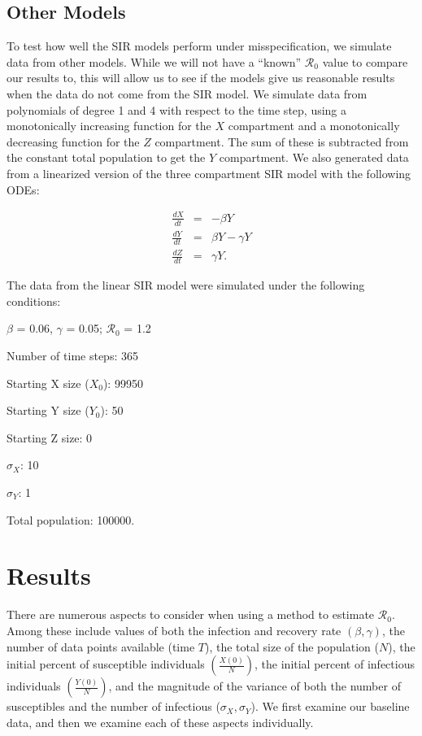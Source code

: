 \message{ !name(draft_v13.tex)}\documentclass[12pt]{article}
\newcommand{\rr}{\ensuremath{\mathcal{R}_0}}
\begin{document}
\subsection{Other Models}

To test how well the SIR models perform under misspecification, we simulate data from other models. While we will not have a ``known'' $\rr$ value to compare our results to, this will allow us to see if the models give us reasonable results when the data do not come from the SIR model. We simulate data from polynomials of degree 1 and 4 with respect to the time step, using a monotonically increasing function for the $X$ compartment and a monotonically decreasing function for the $Z$ compartment. The sum of these is subtracted from the constant total population to get the $Y$ compartment. We also generated data from a linearized version of the three compartment SIR model with the following ODEs:

\begin{eqnarray*}
	\frac{dX}{dt} &=& -\beta Y \\
	\frac{dY}{dt} &=& \beta Y - \gamma Y \\
	\frac{dZ}{dt} &=& \gamma Y.
\end{eqnarray*}

The data from the linear SIR model were simulated under the following conditions:

\begin{center}
	
	$\beta$ = 0.06, $\gamma$ = 0.05; $\rr$ = 1.2
	
	Number of time steps: 365
	
	Starting X size ($X_0$): 99950
	
	Starting Y size ($Y_0$): 50
	
	Starting Z size: 0 
	
	$\sigma_X$: 10
	
	$\sigma_Y$: 1
	
	Total population: 100000.
	
\end{center}

\section{Results}\label{sec:results}
There are numerous aspects to consider when using a method to estimate $\rr$.  Among these include values of both the infection and recovery rate $(\beta, \gamma)$, the number of data points available (time $T$), the total size of the population ($N$), the initial percent of susceptible individuals $\left (\frac{X(0)}{N}\right)$, the initial percent of infectious individuals $\left (\frac{Y(0)}{N}\right )$, and  the magnitude of the variance of both the number of susceptibles and the number of infectious ($\sigma_X, \sigma_Y$).  We first examine our baseline data, and then we examine each of these aspects individually.
\end{document}
